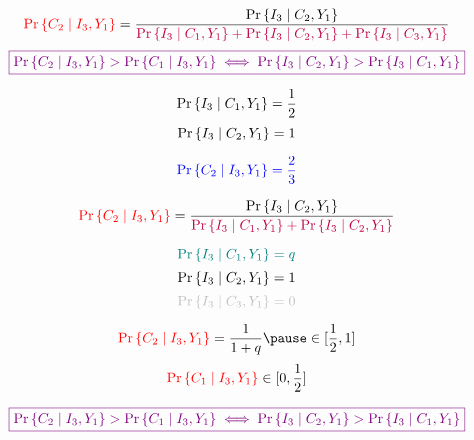 \begin{frame}{}
  \[
    \textcolor{red}{\Pr\left\{C_2 \mid I_3, Y_1\right\}} = \frac{\Pr{\left\{I_3 \mid C_2, Y_1\right\}}}
      {\textcolor{purple}{\Pr\left\{I_3 \mid C_1, Y_1\right\} + \Pr\left\{I_3 \mid C_2, Y_1\right\} + \Pr\left\{I_3 \mid C_3, Y_1\right\}}}
  \]
  \[
    \textcolor{violet}{\boxed{\Pr\left\{C_2 \mid I_3, Y_1\right\} > \Pr\left\{C_1 \mid I_3, Y_1\right\} \iff \Pr{\left\{I_3 \mid C_2, Y_1\right\}} > \Pr{\left\{I_3 \mid C_1, Y_1\right\}}}}
  \]

  \pause
  \vspace{0.30cm}
  \[
    \Pr\left\{I_3 \mid C_1, Y_1\right\} = \frac{1}{2}
  \]
  \[
    \Pr\left\{I_3 \mid C_2, Y_1\right\} = 1
  \]

  \[
    \textcolor{blue}{\Pr\left\{C_2 \mid I_3, Y_1\right\} = \frac{2}{3}}
  \]

  \pause
  \vspace{0.30cm}
  \begin{center}
  \end{center}
\end{frame}

\begin{frame}{}
  \[
    \textcolor{red}{\Pr\left\{C_2 \mid I_3, Y_1\right\}} = \frac{\Pr{\left\{I_3 \mid C_2, Y_1\right\}}}
      {\textcolor{purple}{\Pr\left\{I_3 \mid C_1, Y_1\right\} + \Pr\left\{I_3 \mid C_2, Y_1\right\}}}
  \]

  \pause
  \[
    \textcolor{teal}{\Pr\left\{I_3 \mid C_1, Y_1\right\} = q}
  \]
  \[
    \Pr\left\{I_3 \mid C_2, Y_1\right\} = 1
  \]
  \[
    \lgray{\Pr\set{I_3 \mid C_3, Y_1} = 0}
  \]

  \pause
  \[
    \red{\Pr\set{C_2 \mid I_3, Y_1}} = \frac{1}{1 + q} \pause \in [\frac{1}{2}, 1]
  \]
  \pause
  \[
    \textcolor{red}{\Pr\left\{C_1 \mid I_3, Y_1\right\}} \in [0, \frac{1}{2}]
  \]

  \pause
  \vspace{-0.20cm}
  \[
    \textcolor{violet}{\boxed{\Pr\left\{C_2 \mid I_3, Y_1\right\} > \Pr\left\{C_1 \mid I_3, Y_1\right\} \iff \Pr{\left\{I_3 \mid C_2, Y_1\right\}} > \Pr{\left\{I_3 \mid C_1, Y_1\right\}}}}
  \]

  \pause
  \vspace{-0.20cm}
  \centerline{}
\end{frame}

